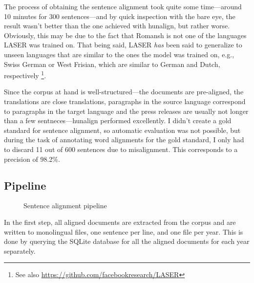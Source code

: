 The process of obtaining the sentence alignment took quite some time---around 10 minutes for 300 sentences---and by quick inspection with the bare eye, the result wasn't better than the one achieved with hunalign, but rather worse. 
Obviously, this may be due to the fact that Romansh is not one of the languages LASER was trained on. 
That being said, LASER \emph{has} been said to generalize to unseen languages that are similar to the ones the model was trained on, e.g., Swiss German or West Frisian, which are similar to German and Dutch, respectively \autocite{artexte-schwenk-2019-laser} 
\footnote{See also \url{https://github.com/facebookresearch/LASER}}.

Since the corpus at hand is well-structured---the documents are pre-aligned, the translations are close translations, paragraphs in the source language correspond to paragraphs in the target language and the press releases are usually not longer than a few sentneces---hunalign performed excellently. 
I didn't create a gold standard for sentence alignment, so automatic evaluation was not possible, but during the task of annotating word alignments for the gold standard, I only had to discard 11 out of 600 sentences due to  misalignment. 
This corresponds to a precision of 98.2\%.

\subsection{Pipeline}

\begin{figure}
\centering
{}
\caption{Sentence alignment pipeline}
\label{fig:sentence-alignment}
\end{figure}

In the first step, all aligned documents are extracted from the corpus and are written to monolingual files, one sentence per line, and one file per year.
This is done by querying the SQLite database for all the aligned documents for each year separately. 

